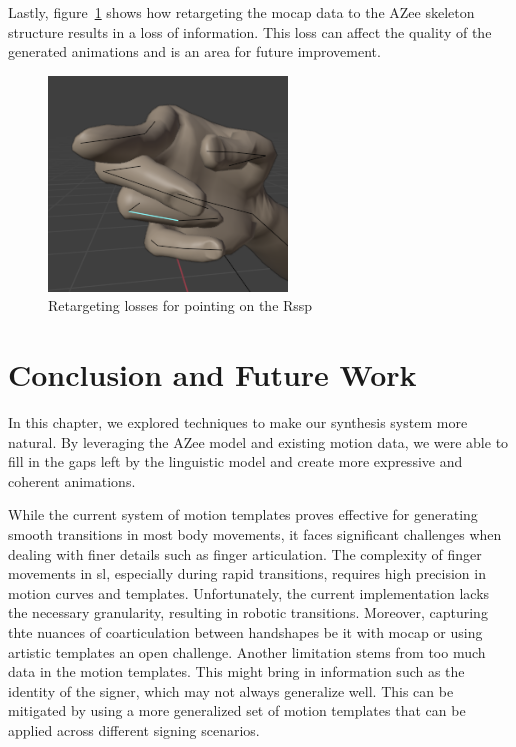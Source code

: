 \documentclass[../../main.tex]{subfiles}
\begin{document}
Lastly, figure~\ref{fig:losses} shows how retargeting the \gls{mocap} data to the AZee skeleton structure results in a loss of information. This loss can affect the quality of the generated animations and is an area for future improvement.

\begin{figure}
  \centering \includegraphics[width = 2.5in]{chapters/intermediate_blocks_pose_correction/images/losses.png}
  \caption{Retargeting losses for pointing on the Rssp}
  \label{fig:losses}
\end{figure}

\section{Conclusion and Future Work}
\label{ch:intermediate_blocks_pose_correction:conclusion_and_future_work}

In this chapter, we explored techniques to make our synthesis system more natural. By leveraging the AZee model and existing motion data, we were able to fill in the gaps left by the linguistic model and create more expressive and coherent animations. 

While the current system of motion templates proves effective for generating smooth transitions in most body movements, it faces significant challenges when dealing with finer details such as finger articulation. The complexity of finger movements in \gls{sl}, especially during rapid transitions, requires high precision in motion curves and templates. Unfortunately, the current implementation lacks the necessary granularity, resulting in robotic transitions. Moreover, capturing thte nuances of coarticulation between handshapes be it with \gls{mocap} or using artistic templates an open challenge. Another limitation stems from too much data in the motion templates. This might bring in information such as the identity of the signer, which may not always generalize well. This can be mitigated by using a more generalized set of motion templates that can be applied across different signing scenarios.
\end{document}
